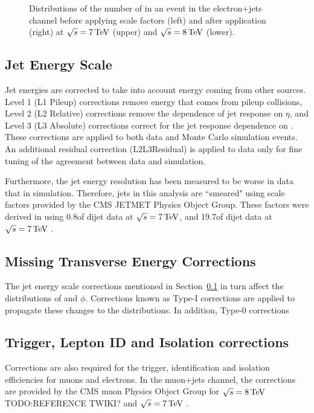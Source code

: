 \begin{figure}[hbtp]
     \caption{Distributions of the number of \btags in an event in the electron+jets channel before applying
     \btag scale factors (left) and after application (right) at $\sqrt{s}=7\,\text{Te\hspace{-.08em}V}$
     (upper) and $\sqrt{s}=8\,\text{Te\hspace{-.08em}V}$ (lower).}
     \label{fig:nbjets_before_and_after_btag_scale_factors_electrons}
\end{figure}


\subsection{Jet Energy Scale}
\label{sss:jet_energy_scale}
Jet energies are corrected to take into account energy coming from other sources. Level 1 (L1 Pileup)
corrections remove energy that comes from pileup collisions, Level 2 (L2 Relative) corrections remove the
dependence of jet response on $\eta$, and Level 3 (L3 Absolute) corrections correct for the jet response
dependence on \pt \cite{Chatrchyan:2011ds}. These corrections are applied to both data and Monte Carlo
simulation events. An additional residual correction (L2L3Residual) is applied to data only for fine tuning of the agreement between data and
simulation.

Furthermore, the jet energy resolution has been measured to be worse in data that in simulation.
Therefore, jets in this analysis are ``smeared" using scale factors provided by the CMS JETMET Physics Object
Group. These factors were derived in \cite{Chatrchyan:2011ds} using 0.8\fbinv of dijet data at
$\sqrt{s}=7\,\text{Te\hspace{-.08em}V}$, and 19.7\fbinv of dijet data at $\sqrt{s}=7\,\text{Te\hspace{-.08em}V}$ \cite{jet_res_2012}.

\subsection{Missing Transverse Energy Corrections}
\label{ss:met_corrections}
The jet energy scale corrections mentioned in Section~\ref{sss:jet_energy_scale} in turn affect the
distributions of \met and \met $\phi$. Corrections known as Type-I \met corrections are applied to propagate
these changes to the \met distributions. In addition, Type-0 corrections 
 
\subsection{Trigger, Lepton ID and Isolation corrections}
\label{ss:trigger_ID_isolation_corrections}
Corrections are also required for the trigger, identification and isolation efficiencies for muons and
electrons. In the muon+jets channel, the corrections are provided by the CMS muon Physics Object Group
for $\sqrt{s}=8\,\text{Te\hspace{-.08em}V}$ TODO:REFERENCE TWIKI? %
and $\sqrt{s}=7\,\text{Te\hspace{-.08em}V}$ \cite{CMS-PAS-SMP-13-013}.

